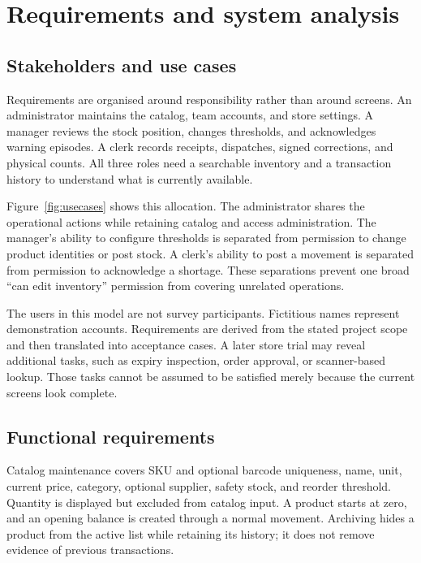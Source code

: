 \chapter{Requirements and system analysis}\label{ch:requirements}
\section{Stakeholders and use cases}
Requirements are organised around responsibility rather than around screens. An administrator maintains the catalog, team accounts, and store settings. A manager reviews the stock position, changes thresholds, and acknowledges warning episodes. A clerk records receipts, dispatches, signed corrections, and physical counts. All three roles need a searchable inventory and a transaction history to understand what is currently available.

Figure~\ref{fig:usecases} shows this allocation. The administrator shares the operational actions while retaining catalog and access administration. The manager's ability to configure thresholds is separated from permission to change product identities or post stock. A clerk's ability to post a movement is separated from permission to acknowledge a shortage. These separations prevent one broad ``can edit inventory'' permission from covering unrelated operations.


The users in this model are not survey participants. Fictitious names represent demonstration accounts. Requirements are derived from the stated project scope and then translated into acceptance cases. A later store trial may reveal additional tasks, such as expiry inspection, order approval, or scanner-based lookup. Those tasks cannot be assumed to be satisfied merely because the current screens look complete.

\section{Functional requirements}
Catalog maintenance covers SKU and optional barcode uniqueness, name, unit, current price, category, optional supplier, safety stock, and reorder threshold. Quantity is displayed but excluded from catalog input. A product starts at zero, and an opening balance is created through a normal movement. Archiving hides a product from the active list while retaining its history; it does not remove evidence of previous transactions.

